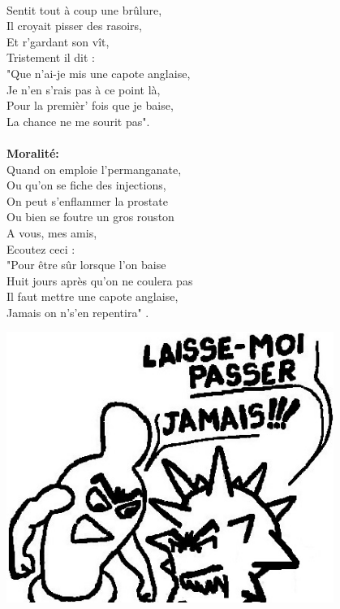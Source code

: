 \\Sentit tout à coup une brûlure,
\\Il croyait pisser des rasoirs,
\\Et r'gardant son vît,
\\Tristement il dit :
\\"Que n'ai-je mis une capote anglaise,
\\Je n'en s'rais pas à ce point là,
\\Pour la premièr' fois que je baise,
\\La chance ne me sourit pas".
\\\\\textbf{Moralité:}
\\Quand on emploie l'permanganate,
\\Ou qu'on se fiche des injections,
\\On peut s'enflammer la prostate
\\Ou bien se foutre un gros rouston
\\A vous, mes amis,
\\Ecoutez ceci :
\\"Pour être sûr lorsque l'on baise
\\Huit jours après qu'on ne coulera pas
\\Il faut mettre une capote anglaise,
\\Jamais on n's'en repentira" .
\begin{center}
   \includegraphics[width=0.8\textwidth]{images/capote_anglaise.jpg}
 \end{center}

\breakpage